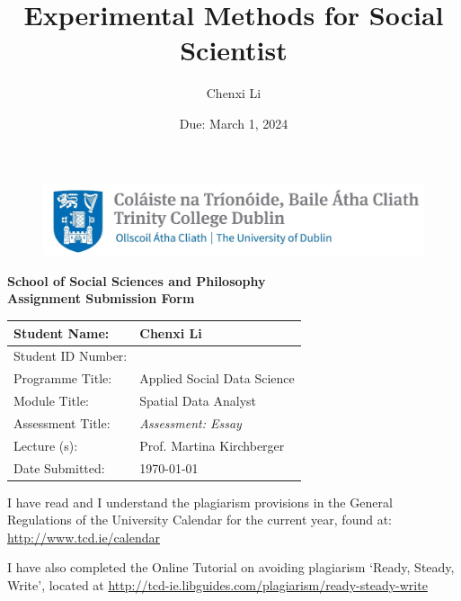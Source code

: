 \documentclass[12pt]{article} %
\title{Experimental Methods for Social Scientist }
\date{Due: March 1, 2024}
\author{Chenxi Li}
\begin{document}
\begin{figure}[h]
	\centering
	\vspace{-2.5cm}
	\hspace{-8cm}
	\includegraphics[width=12cm]{Trinity_icon.jpg}  
\end{figure}

\vspace{.5cm}
\begin{center}
    {\fontsize{17.28}{22}\selectfont\bfseries School of Social Sciences and Philosophy} \\
    {\fontsize{17.28}{22}\selectfont\bfseries Assignment Submission Form}
\end{center}

\vspace{.7cm}


\begin{center}
		\begin{tabular}{|>{\arraybackslash}p{4cm}|>{\arraybackslash}p{8cm}|}
			\hline
			Student Name: & Chenxi Li\\
			\hline
			Student ID Number: & 23330541 \\
			\hline
			Programme Title: & Applied Social Data Science \\
			\hline
			Module Title: & Spatial Data Analyst \\
			\hline
			Assessment Title: & \textit{Assessment: Essay}\\
			\hline
			Lecture (s): & Prof. Martina Kirchberger \\
			\hline
			Date Submitted: & \today \\
			\hline
		\end{tabular}
\end{center}

\vspace{.7cm}

\noindent I have read and I understand the plagiarism provisions in the General Regulations of the University Calendar for the current year, found at:  \url{http://www.tcd.ie/calendar} 
\par
\noindent I have also completed the Online Tutorial on avoiding plagiarism ‘Ready, Steady, Write’, located at \url{http://tcd-ie.libguides.com/plagiarism/ready-steady-write} 
\end{document}
